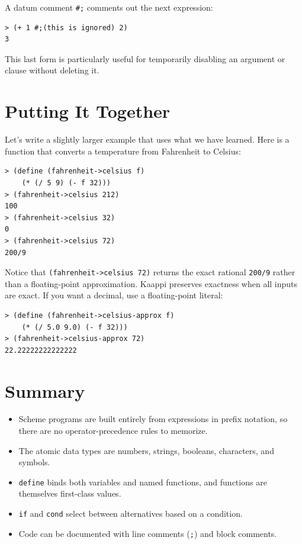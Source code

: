 A datum comment \texttt{\#;} comments out the next expression:

\begin{lstlisting}[style=repl]
> (+ 1 #;(this is ignored) 2)
3
\end{lstlisting}

This last form is particularly useful for temporarily disabling an argument or clause without deleting it.

\section{Putting It Together}

Let's write a slightly larger example that uses what we have learned. Here is a function that converts a temperature from Fahrenheit to Celsius:

\begin{lstlisting}[style=repl]
> (define (fahrenheit->celsius f)
    (* (/ 5 9) (- f 32)))
> (fahrenheit->celsius 212)
100
> (fahrenheit->celsius 32)
0
> (fahrenheit->celsius 72)
200/9
\end{lstlisting}

Notice that \texttt{(fahrenheit->celsius 72)} returns the exact rational \texttt{200/9} rather than a floating-point approximation. Kaappi preserves exactness when all inputs are exact. If you want a decimal, use a floating-point literal:

\begin{lstlisting}[style=repl]
> (define (fahrenheit->celsius-approx f)
    (* (/ 5.0 9.0) (- f 32)))
> (fahrenheit->celsius-approx 72)
22.22222222222222
\end{lstlisting}

\section*{Summary}

\begin{itemize}
    \item Scheme programs are built entirely from expressions in prefix notation, so there are no operator-precedence rules to memorize.
    \item The atomic data types are numbers, strings, booleans, characters, and symbols.
    \item \texttt{define} binds both variables and named functions, and functions are themselves first-class values.
    \item \texttt{if} and \texttt{cond} select between alternatives based on a condition.
    \item Code can be documented with line comments (\texttt{;}) and block comments.
\end{itemize}


